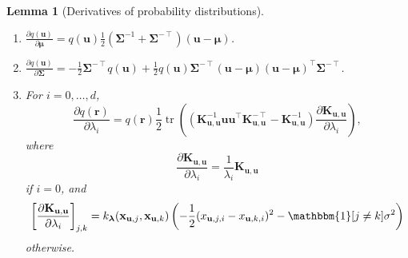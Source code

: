 \documentclass{article}
\newtheorem{lemma}[theorem]{Lemma}
\theoremstyle{definition}
\theoremstyle{remark}
\DeclareMathOperator{\tr}{tr}
\newcommand{\Kuu}{\mathbf{K}_{\mathbf{u},\mathbf{u}}}
\begin{document}
\begin{lemma}[Derivatives of probability
  distributions] \label{lemma:derivatives}
  \begin{enumerate}
    \leavevmode
  \item $\frac{\partial q(\mathbf{u})}{\partial \bm\mu} =
    q(\mathbf{u})\frac{1}{2}(\bm\Sigma^{-1} +
    \bm\Sigma^{-\intercal})(\mathbf{u} - \bm\mu)$.
  \item $\frac{\partial q(\mathbf{u})}{\partial \bm\Sigma} =
    -\frac{1}{2}\bm\Sigma^{-\intercal}q(\mathbf{u}) +
    \frac{1}{2}q(\mathbf{u})\bm\Sigma^{-\intercal}(\mathbf{u} -
    \bm\mu)(\mathbf{u} - \bm\mu)^\intercal\bm\Sigma^{-\intercal}$.
  \item For $i = 0, \dots, d$,
    \[
      \frac{\partial q(\mathbf{r})}{\partial \lambda_i} =
      q(\mathbf{r})\frac{1}{2}\tr
      \left((\Kuu^{-1}\mathbf{u}\mathbf{u}^\intercal\Kuu^{-\intercal} -
        \Kuu^{-1}) \frac{\partial \Kuu}{\partial \lambda_i} \right),
    \]
    where
    \[
      \frac{\partial \Kuu}{\partial \lambda_i} = \frac{1}{\lambda_i}\Kuu
    \]
    if $i = 0$, and
    \[
      \left[ \frac{\partial \Kuu}{\partial \lambda_i} \right]_{j,k} =
      k_{\bm\lambda}(\mathbf{x}_{\mathbf{u},j}, \mathbf{x}_{\mathbf{u},k})
      \left( -\frac{1}{2}(x_{\mathbf{u},j,i} - x_{\mathbf{u},k,i})^2 -
        \mathbbm{1}[j \ne k]\sigma^2 \right)
    \]
    otherwise.
  \end{enumerate}
\end{lemma}
\end{document}
